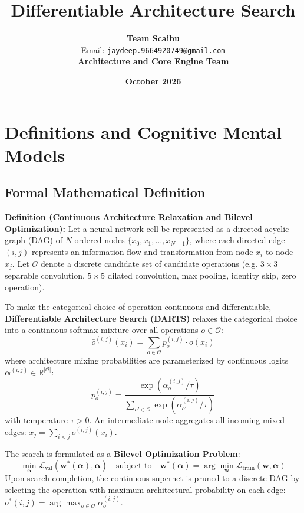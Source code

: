 \documentclass[11pt,a4paper]{article}
\title{\textbf{Differentiable Architecture Search}}
\author{\textbf{Team Scaibu} \\ \small Email: \texttt{jaydeep.9664920749@gmail.com} \\ \small \textbf{Architecture and Core Engine Team}}
\date{\textbf{October 2026}}
\theoremstyle{definition}
\begin{document}
\maketitle

\section{Definitions and Cognitive Mental Models}

\subsection{Formal Mathematical Definition}
\textbf{Definition (Continuous Architecture Relaxation and Bilevel Optimization):}
Let a neural network cell be represented as a directed acyclic graph (DAG) of $N$ ordered nodes $\{x_0, x_1, \dots, x_{N-1}\}$, where each directed edge $(i, j)$ represents an information flow and transformation from node $x_i$ to node $x_j$. Let $\mathcal{O}$ denote a discrete candidate set of candidate operations (e.g. $3\times3$ separable convolution, $5\times5$ dilated convolution, max pooling, identity skip, zero operation).

To make the categorical choice of operation continuous and differentiable, \textbf{Differentiable Architecture Search (DARTS)} relaxes the categorical choice into a continuous softmax mixture over all operations $o \in \mathcal{O}$:
{\boldmath
\begin{equation}
\bar{o}^{(i, j)}(x_i) = \sum_{o \in \mathcal{O}} p_o^{(i, j)} \cdot o(x_i)
\end{equation}
}
where architecture mixing probabilities are parameterized by continuous logits $\boldsymbol{\alpha}^{(i, j)} \in \mathbb{R}^{|\mathcal{O}|}$:
{\boldmath
\begin{equation}
p_o^{(i, j)} = \frac{\exp\left( \alpha_o^{(i, j)} / \tau \right)}{\sum_{o' \in \mathcal{O}} \exp\left( \alpha_{o'}^{(i, j)} / \tau \right)}
\end{equation}
}
with temperature $\tau > 0$. An intermediate node aggregates all incoming mixed edges: $x_j = \sum_{i < j} \bar{o}^{(i, j)}(x_i)$.

The search is formulated as a \textbf{Bilevel Optimization Problem}:
{\boldmath
\begin{equation}
\min_{\boldsymbol{\alpha}} \mathcal{L}_{\text{val}}\left( \mathbf{w}^*(\boldsymbol{\alpha}), \boldsymbol{\alpha} \right) \quad \text{subject to} \quad \mathbf{w}^*(\boldsymbol{\alpha}) = \arg\min_{\mathbf{w}} \mathcal{L}_{\text{train}}(\mathbf{w}, \boldsymbol{\alpha})
\end{equation}
}
Upon search completion, the continuous supernet is pruned to a discrete DAG by selecting the operation with maximum architectural probability on each edge: $o^*(i, j) = \arg\max_{o \in \mathcal{O}} \alpha_o^{(i, j)}$.
\end{document}
